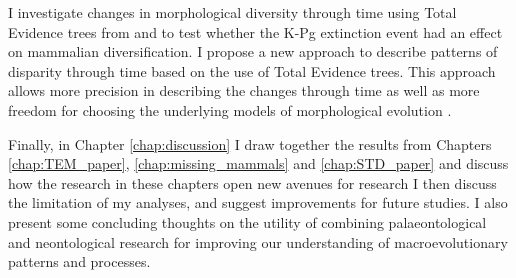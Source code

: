 I investigate changes in morphological diversity \citep[or disparity;][]{Wills1994} through time using Total Evidence trees from \cite{slaterphylogenetic2013} and \cite{beckancient2014} to test whether the K-Pg extinction event had an effect on mammalian diversification.
I propose a new approach to describe patterns of disparity through time based on the use of Total Evidence trees.
This approach allows more precision in describing the changes through time as well as more freedom for choosing the underlying models of morphological evolution \citep[e.g. punctuated or gradual;][]{Hunt21042015}.



Finally, in Chapter \ref{chap:discussion} I draw together the results from Chapters \ref{chap:TEM_paper}, \ref{chap:missing_mammals} and \ref{chap:STD_paper} and discuss how the research in these chapters open new avenues for research %
I then discuss the limitation of my analyses, and suggest improvements for future studies.
I also present some concluding thoughts on the utility of combining palaeontological and neontological research for improving our understanding of macroevolutionary patterns and processes.

%